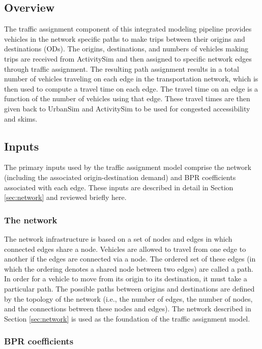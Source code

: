 \subsection{Overview}

The traffic assignment component of this integrated modeling pipeline provides vehicles in the network specific paths to make trips between their origins and destinations (ODs). The origins, destinations, and numbers of vehicles making trips are received from ActivitySim and then assigned to specific network edges through traffic assignment. The resulting path assignment results in a total number of vehicles traveling on each edge in the transportation network, which is then used to compute a travel time on each edge. The travel time on an edge is a function of the number of vehicles using that edge. These travel times are then given back to UrbanSim and ActivitySim to be used for congested accessibility and skims.


\subsection{Inputs}

The primary inputs used by the traffic assignment model comprise the network (including the associated origin-destination demand) and BPR coefficients associated with each edge. These inputs are described in detail in Section \ref{sec:network} and reviewed briefly here.


\subsubsection{The network}

The network infrastructure is based on a set of nodes and edges in which connected edges share a node. Vehicles are allowed to travel from one edge to another if the edges are connected via a node. The ordered set of these edges (in which the ordering denotes a shared node between two edges) are called a path. In order for a vehicle to move from its origin to its destination, it must take a particular path. The possible paths between origins and destinations are defined by the topology of the network (i.e., the number of edges, the number of nodes, and the connections between these nodes and edges). The network described in Section \ref{sec:network} is used as the foundation of the traffic assignment model. 


\subsubsection{BPR coefficients}


